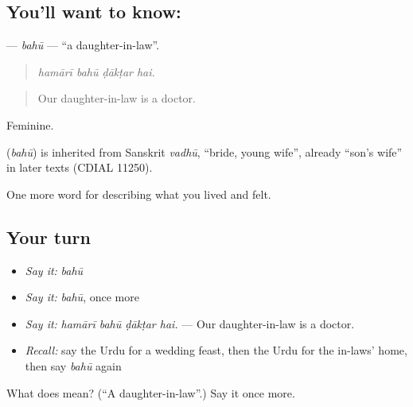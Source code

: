 \subsection*{You'll want to know: }
\textbf{} — \emph{bahū} — \textquotedblleft{}a daughter-in-law\textquotedblright{}.

\begin{quote}
   
\end{quote}

\begin{quote}
\emph{hamārī bahū ḍākṭar hai.}
\end{quote}

\begin{quote}
Our daughter-in-law is a doctor.
\end{quote}

Feminine.

\begin{cousinweb}
\textbf{} (\emph{bahū}) is inherited from Sanskrit \emph{vadhū}, \textquotedblleft{}bride, young wife\textquotedblright{}, already \textquotedblleft{}son's wife\textquotedblright{} in later texts (CDIAL 11250).
\end{cousinweb}

\begin{grammarlens}[title={What you've built}]
One more word for describing what you lived and felt.
\end{grammarlens}

\subsection*{Your turn}
\begin{itemize}
\raggedright
  \item \emph{Say it:} \emph{bahū}
  \item \emph{Say it:} \emph{bahū}, once more
  \item \emph{Say it:} \emph{hamārī bahū ḍākṭar hai.} — Our daughter-in-law is a doctor.
  \item \emph{Recall:} say the Urdu for a wedding feast, then the Urdu for the in-laws' home, then say \emph{bahū} again
\end{itemize}

\begin{tcolorbox}[breakable,colback=teal!4,colframe=teal!35!black,title={Before you move on}]
What does  mean? (\textquotedblleft{}A daughter-in-law\textquotedblright{}.) Say it once more.
\end{tcolorbox}
